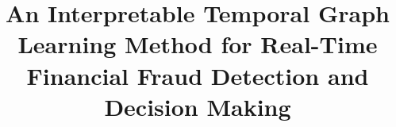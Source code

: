 \documentclass[preprint,12pt,authoryear]{elsarticle}
\begin{document}
\begin{frontmatter}



\title{An Interpretable Temporal Graph Learning Method for Real-Time Financial Fraud Detection and Decision Making}





            



\end{frontmatter}
\end{document}
